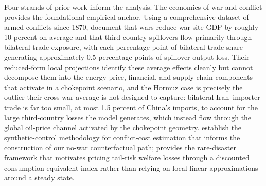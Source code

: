 \documentclass[12pt]{article}
\begin{document}
Four strands of prior work inform the analysis. The economics of war and conflict provides the foundational empirical anchor. Using a comprehensive dataset of armed conflicts since 1870, \citet{federle2026price} document that wars reduce war-site GDP by roughly 10 percent on average and that third-country spillovers flow primarily through bilateral trade exposure, with each percentage point of bilateral trade share generating approximately 0.5 percentage points of spillover output loss. Their reduced-form local projections identify these average effects cleanly but cannot decompose them into the energy-price, financial, and supply-chain components that activate in a chokepoint scenario, and the Hormuz case is precisely the outlier their cross-war average is not designed to capture: bilateral Iran--importer trade is far too small, at most 1.5 percent of China's imports, to account for the large third-country losses the model generates, which instead flow through the global oil-price channel activated by the chokepoint geometry. \citet{abadie2003economic} establish the synthetic-control methodology for conflict-cost estimation that informs the construction of our no-war counterfactual path; \citet{barro2006rare} provides the rare-disaster framework that motivates pricing tail-risk welfare losses through a discounted consumption-equivalent index rather than relying on local linear approximations around a steady state.
\end{document}
